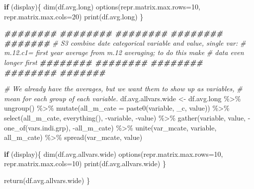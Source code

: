 \documentclass[
]{book}
\newenvironment{Shaded}{\begin{snugshade}}{\end{snugshade}}
\newcommand{\AttributeTok}[1]{\textcolor[rgb]{0.77,0.63,0.00}{#1}}
\newcommand{\CommentTok}[1]{\textcolor[rgb]{0.56,0.35,0.01}{\textit{#1}}}
\newcommand{\ControlFlowTok}[1]{\textcolor[rgb]{0.13,0.29,0.53}{\textbf{#1}}}
\newcommand{\DecValTok}[1]{\textcolor[rgb]{0.00,0.00,0.81}{#1}}
\newcommand{\DocumentationTok}[1]{\textcolor[rgb]{0.56,0.35,0.01}{\textbf{\textit{#1}}}}
\newcommand{\FunctionTok}[1]{\textcolor[rgb]{0.00,0.00,0.00}{#1}}
\newcommand{\NormalTok}[1]{#1}
\newcommand{\OtherTok}[1]{\textcolor[rgb]{0.56,0.35,0.01}{#1}}
\newcommand{\SpecialCharTok}[1]{\textcolor[rgb]{0.00,0.00,0.00}{#1}}
\newcommand{\StringTok}[1]{\textcolor[rgb]{0.31,0.60,0.02}{#1}}
\begin{document}
\begin{Shaded}
\begin{Highlighting}[]
\ControlFlowTok{if}\NormalTok{ (display)\{}
  \FunctionTok{dim}\NormalTok{(df.avg.long)}
  \FunctionTok{options}\NormalTok{(}\AttributeTok{repr.matrix.max.rows=}\DecValTok{10}\NormalTok{, }\AttributeTok{repr.matrix.max.cols=}\DecValTok{20}\NormalTok{)}
  \FunctionTok{print}\NormalTok{(df.avg.long)}
\NormalTok{\}}

\DocumentationTok{\#\#\#\#\#\#\#\# \#\#\#\#\#\#\#\# \#\#\#\#\#\#\#\# \#\#\#\#\#\#\#\# \#\#\#\#\#\#\#}
\CommentTok{\# S3 combine date categorical variable and value, single var:}
\CommentTok{\# m.12.c1= first year average from m.12 averaging; to do this make }
\CommentTok{\# data even longer first}
\DocumentationTok{\#\#\#\#\#\#\#\# \#\#\#\#\#\#\#\# \#\#\#\#\#\#\#\# \#\#\#\#\#\#\#\# \#\#\#\#\#\#\#}

\CommentTok{\# We already have the averages, but we want them to show up as variables,}
    \CommentTok{\# mean for each group of each variable.}
\NormalTok{df.avg.allvars.wide }\OtherTok{\textless{}{-}}\NormalTok{ df.avg.long }\SpecialCharTok{\%\textgreater{}\%}
   \FunctionTok{ungroup}\NormalTok{() }\SpecialCharTok{\%\textgreater{}\%}
   \FunctionTok{mutate}\NormalTok{(}\AttributeTok{all\_m\_cate =} \FunctionTok{paste0}\NormalTok{(variable, }\StringTok{\textquotesingle{}\_c\textquotesingle{}}\NormalTok{, value)) }\SpecialCharTok{\%\textgreater{}\%}
   \FunctionTok{select}\NormalTok{(all\_m\_cate, }\FunctionTok{everything}\NormalTok{(), }\SpecialCharTok{{-}}\NormalTok{variable, }\SpecialCharTok{{-}}\NormalTok{value) }\SpecialCharTok{\%\textgreater{}\%}
   \FunctionTok{gather}\NormalTok{(variable, value, }\SpecialCharTok{{-}}\FunctionTok{one\_of}\NormalTok{(vars.indi.grp), }\SpecialCharTok{{-}}\NormalTok{all\_m\_cate) }\SpecialCharTok{\%\textgreater{}\%}
   \FunctionTok{unite}\NormalTok{(}\StringTok{\textquotesingle{}var\_mcate\textquotesingle{}}\NormalTok{, variable, all\_m\_cate) }\SpecialCharTok{\%\textgreater{}\%}
   \FunctionTok{spread}\NormalTok{(var\_mcate, value)}

\ControlFlowTok{if}\NormalTok{ (display)\{}
  \FunctionTok{dim}\NormalTok{(df.avg.allvars.wide)}
  \FunctionTok{options}\NormalTok{(}\AttributeTok{repr.matrix.max.rows=}\DecValTok{10}\NormalTok{, }\AttributeTok{repr.matrix.max.cols=}\DecValTok{10}\NormalTok{)}
  \FunctionTok{print}\NormalTok{(df.avg.allvars.wide)}
\NormalTok{\}}

\FunctionTok{return}\NormalTok{(df.avg.allvars.wide)}
\NormalTok{\}}
\end{Highlighting}
\end{Shaded}
\end{document}
